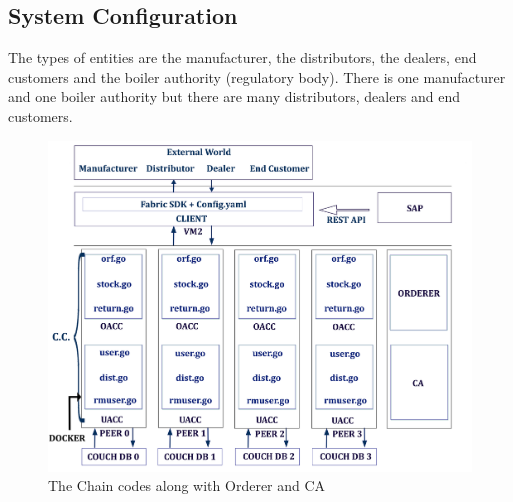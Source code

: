 \documentclass{article}
\begin{document}
\subsection{System Configuration}
The types of entities are the manufacturer, the distributors, the dealers, end customers and the boiler authority (regulatory body). There is one manufacturer and one boiler authority but there are many distributors, dealers and end customers.  
\begin{figure}[ht]
\centering
\includegraphics[scale=0.07]{Architecture-Diagram.png}
\caption{The Chain codes along with Orderer and CA}
\end{figure}
\end{document}
